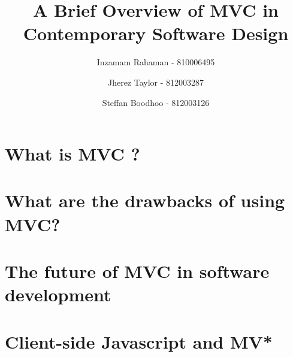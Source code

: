 \documentclass[
oneside,
openany,
12pt, a4paper,
footinclude=true,
headinclude=true,
cleardoublepage=empty
]{scrbook}
\title{A Brief Overview of MVC in Contemporary Software Design}
\author{Inzamam Rahaman - 810006495 \and Jherez Taylor - 812003287 \and Steffan Boodhoo - 812003126 }
\begin{document}
  \maketitle

  
  


  \chapter{What is MVC ?}
  

  \chapter{What are the drawbacks of using MVC?}
  

  \chapter{The future of MVC in software development}
  

  \chapter{Client-side Javascript and MV*}
  
\end{document}
